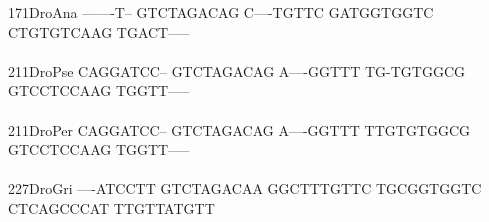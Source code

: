 \documentclass[11pt,twoside,reqno,a4paper]{article}
\begin{document}
{171\hspace*{1\charwidth}DroAna	-------T--	GTCTAGACAG	C----TGTTC	GATGGTGGTC	CTGTGTCAAG	TGACT-----	\\
\hspace*{4\charwidth}\hspace*{7\charwidth}\hspace*{1\charwidth}\hspace*{1\charwidth}\hspace*{1\charwidth}\hspace*{1\charwidth}\hspace*{1\charwidth}\hspace*{1\charwidth}\\
211\hspace*{1\charwidth}DroPse	CAGGATCC--	GTCTAGACAG	A----GGTTT	TG-TGTGGCG	GTCCTCCAAG	TGGTT-----	\\
\hspace*{4\charwidth}\hspace*{7\charwidth}\hspace*{1\charwidth}\hspace*{1\charwidth}\hspace*{1\charwidth}\hspace*{1\charwidth}\hspace*{1\charwidth}\hspace*{1\charwidth}\\
211\hspace*{1\charwidth}DroPer	CAGGATCC--	GTCTAGACAG	A----GGTTT	TTGTGTGGCG	GTCCTCCAAG	TGGTT-----	\\
\hspace*{4\charwidth}\hspace*{7\charwidth}\hspace*{1\charwidth}\hspace*{1\charwidth}\hspace*{1\charwidth}\hspace*{1\charwidth}\hspace*{1\charwidth}\hspace*{1\charwidth}\\
227\hspace*{1\charwidth}DroGri	----ATCCTT	GTCTAGACAA	GGCTTTGTTC	TGCGGTGGTC	CTCAGCCCAT	TTGTTATGTT	\\
\hspace*{4\charwidth}\hspace*{7\charwidth}\hspace*{1\charwidth}\hspace*{1\charwidth}\hspace*{1\charwidth}\hspace*{1\charwidth}\hspace*{1\charwidth}\hspace*{1\charwidth}\\
}
\end{document}

